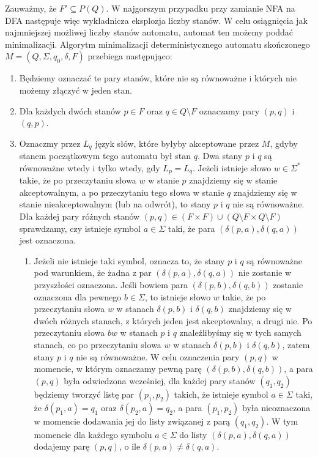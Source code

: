 Zauważmy, że $F'\subseteq P(Q)$. W najgorszym przypadku przy zamianie NFA na DFA następuje więc wykładnicza eksplozja liczby stanów. W celu osiągnięcia jak najmniejszej możliwej liczby stanów automatu, automat ten możemy poddać minimalizacji. Algorytm minimalizacji deterministycznego automatu skończonego $M=(Q,\Sigma,q_0,\delta,F)$ przebiega następująco:
\begin{enumerate}
    \item Będziemy oznaczać te pary stanów, które nie są równoważne i których nie możemy złączyć w jeden stan.
    \item Dla każdych dwóch stanów $p\in F$ oraz $q\in Q\setminus F$ oznaczamy pary $(p,q)$ i $(q,p)$.
    \item Oznaczmy przez $L_q$ język słów, które byłyby akceptowane przez $M$, gdyby stanem początkowym tego automatu był stan $q$. Dwa stany $p$ i $q$ są równoważne wtedy i tylko wtedy, gdy $L_p=L_q$. Jeżeli istnieje słowo $w\in\Sigma^*$ takie, że po przeczytaniu słowa $w$ w stanie $p$ znajdziemy się w stanie akceptowalnym, a po przeczytaniu tego słowa w stanie $q$ znajdziemy się w stanie nieakceptowalnym (lub na odwrót), to stany $p$ i $q$ nie są równoważne. Dla każdej pary różnych stanów $(p,q)\in (F\times F)\cup(Q\setminus F\times Q\setminus F)$ sprawdzamy, czy istnieje symbol $a\in\Sigma$ taki, że para $(\delta(p,a),\delta(q,a))$ jest oznaczona.
    \begin{enumerate}
        \item Jeżeli nie istnieje taki symbol, oznacza to, że stany $p$ i $q$ są równoważne pod warunkiem, że żadna z par $(\delta(p,a),\delta(q,a))$ nie zostanie w przyszłości oznaczona. Jeśli bowiem para $(\delta(p,b),\delta(q,b))$ zostanie oznaczona dla pewnego $b\in\Sigma$, to istnieje słowo $w$ takie, że po przeczytaniu słowa $w$ w stanach $\delta(p,b)$ i $\delta(q,b)$ znajdziemy się w dwóch różnych stanach, z których jeden jest akceptowalny, a drugi nie. Po przeczytaniu słowa $bw$ w stanach $p$ i $q$ znaleźlibyśmy się w tych samych stanach, co po przeczytaniu słowa $w$ w stanach $\delta(p,b)$ i $\delta(q,b)$, zatem stany $p$ i $q$ nie są równoważne. W celu oznaczenia pary $(p,q)$ w momencie, w którym oznaczamy pewną parę $(\delta(p,b),\delta(q,b))$, a para $(p,q)$ była odwiedzona wcześniej, dla każdej pary stanów $(q_1,q_2)$ będziemy tworzyć listę par $(p_1,p_2)$ takich, że istnieje symbol $a\in\Sigma$ taki, że $\delta(p_1,a)=q_1$ oraz $\delta(p_2,a)=q_2$, a para $(p_1,p_2)$ była nieoznaczona w momencie dodawania jej do listy związanej z parą $(q_1,q_2)$. W tym momencie dla każdego symbolu $a\in\Sigma$ do listy $(\delta(p,a),\delta(q,a))$ dodajemy parę $(p,q)$, o ile $\delta(p,a)\neq\delta(q,a)$.

\end{enumerate}
\end{enumerate}
